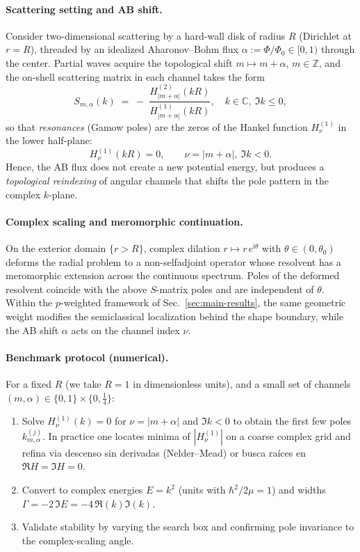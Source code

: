\documentclass[11pt]{article}
\theoremstyle{definition}
\begin{document}
    \paragraph{Scattering setting and AB shift.}
    Consider two-dimensional scattering by a hard-wall disk of radius $R$ (Dirichlet at $r=R$), threaded by an idealized Aharonov--Bohm flux $\alpha:=\Phi/\Phi_0\in[0,1)$ through the center.
    Partial waves acquire the topological shift $m\mapsto m+\alpha$, $m\in\mathbb{Z}$, and the on-shell scattering matrix in each channel takes the form
    \[
    S_{m,\alpha}(k)\;=\;-\;\frac{H^{(2)}_{|m+\alpha|}(kR)}{H^{(1)}_{|m+\alpha|}(kR)}\!,
    \quad k\in\mathbb{C},\ \Im k\le 0,
    \]
    so that \emph{resonances} (Gamow poles) are the zeros of the Hankel function $H^{(1)}_{\nu}$ in the lower half-plane:
    \[
    H^{(1)}_{\nu}(kR)=0,\qquad \nu=|m+\alpha|,\ \Im k<0.
    \]
    Hence, the AB flux does not create a new potential energy, but produces a \emph{topological reindexing} of angular channels that shifts the pole pattern in the complex $k$-plane.
    
    \paragraph{Complex scaling and meromorphic continuation.}
    On the exterior domain $\{r>R\}$, complex dilation $r\mapsto r\,e^{\mathrm{i}\theta}$ with $\theta\in(0,\theta_0)$ deforms the radial problem to a non-selfadjoint operator whose resolvent has a meromorphic extension across the continuous spectrum.
    Poles of the deformed resolvent coincide with the above $S$-matrix poles and are independent of $\theta$.
    Within the $p$-weighted framework of Sec.~\ref{sec:main-results}, the same geometric weight modifies the semiclassical localization behind the shape boundary, while the AB shift $\alpha$ acts on the channel index $\nu$.
    
    \paragraph{Benchmark protocol (numerical).}
    For a fixed $R$ (we take $R=1$ in dimensionless units), and a small set of channels $(m,\alpha)\in\{0,1\}\times\{0,\tfrac14\}$:
    \begin{enumerate}
    	\item Solve $H^{(1)}_{\nu}(k)=0$ for $\nu=|m+\alpha|$ and $\Im k<0$ to obtain the first few poles $k_{m,\alpha}^{(j)}$.
    	In practice one locates minima of $|H^{(1)}_{\nu}|$ on a coarse complex grid and refina via descenso sin derivadas (Nelder--Mead) or busca raíces en $\Re H=\Im H=0$.
    	\item Convert to complex energies $E=k^2$ (units with $\hbar^2/2\mu=1$) and widths $\Gamma=-2\,\Im E=-4\,\Re(k)\Im(k)$.
    	\item Validate stability by varying the search box and confirming pole invariance to the complex-scaling angle.
    \end{enumerate}
    
\end{document}
